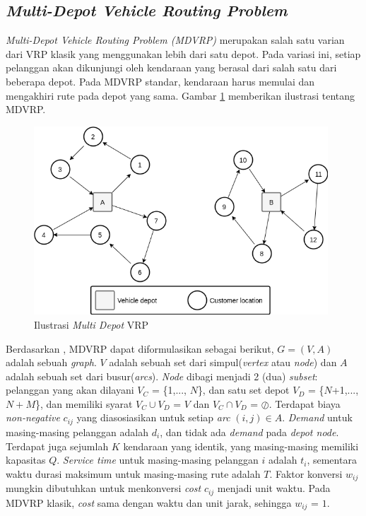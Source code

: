 \subsection{\textit{Multi-Depot Vehicle Routing Problem}}
\label{ssec:mdvrp}
\textit{Multi-Depot Vehicle Routing Problem (MDVRP)} merupakan salah satu varian dari VRP klasik yang menggunakan lebih dari satu depot. Pada variasi ini, setiap pelanggan akan dikunjungi oleh kendaraan yang berasal dari salah satu dari beberapa depot. Pada MDVRP standar, kendaraan harus memulai dan mengakhiri rute pada depot yang sama. Gambar \ref{fig:mdvrp-illustration} memberikan ilustrasi tentang MDVRP.


\begin{figure}[!]
	\centering
	\includegraphics[width=11cm]{Resources/Images/mdvrp-illustration}
	\captionsetup{format=hang}
	\caption{Ilustrasi \textit{Multi Depot} VRP}
	\label{fig:mdvrp-illustration}
\end{figure}


Berdasarkan \citep{renaud_tabu_1996}, MDVRP dapat diformulasikan sebagai berikut, $G = (V, A)$ adalah sebuah \textit{graph}. $V$ adalah sebuah set dari simpul(\textit{vertex} atau \textit{node}) dan $A$ adalah sebuah set dari busur(\textit{arcs}). \textit{Node} dibagi menjadi 2 (dua) \textit{subset}: pelanggan yang akan dilayani $V_C$ = \{1,..., $N$\}, dan satu set depot $V_D$ = \{$N$+1,..., $N+M$\}, dan memiliki syarat $V_C \cup V_D$ = $V$ dan $V_C \cap V_D$ = $\oslash$. Terdapat biaya \textit{non-negative} $c_{ij}$ yang diasosiasikan untuk setiap \textit{arc} $(i, j) \in A$. \textit{Demand} untuk masing-masing pelanggan adalah $d_i$, dan tidak ada \textit{demand} pada \textit{depot node}. Terdapat juga sejumlah $K$ kendaraan yang identik, yang masing-masing memiliki kapasitas $Q$. \textit{Service time} untuk masing-masing pelanggan $i$ adalah $t_i$, sementara waktu durasi maksimum untuk masing-masing rute adalah $T$. Faktor konversi $w_{ij}$ mungkin dibutuhkan untuk menkonversi \textit{cost} $c_{ij}$ menjadi unit waktu. Pada MDVRP klasik, \textit{cost} sama dengan waktu dan unit jarak, sehingga $w_{ij}$ = $1$.


